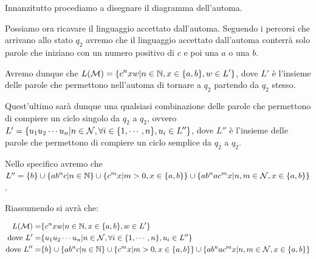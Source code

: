 Innanzitutto procediamo a disegnare il diagramma dell'automa.

\begin{figure}[ht]
    \centering
\end{figure}

Possiamo ora ricavare il linguaggio accettato dall'automa. Seguendo i percorsi che arrivano allo stato \(q_2\) avremo che il linguaggio accettato dall'automa conterrà solo parole che iniziano con un numero positivo di \(c\) e poi una \(a\) o una \(b\).

Avremo dunque che \(L(\mathcal{M})=\displaystyle{\left\{{c^{n}xw \vert n \in \mathbb{N}, x \in \displaystyle{\left\{{a,b}\right\}}, w \in L'}\right\}} \), dove \(L'\) è l'insieme delle parole che permettono nell'automa di tornare a \(q_2\) partendo da \(q_2\) stesso.

Quest'ultimo sarà dunque una qualsiasi combinazione delle parole che permettono di compiere un ciclo singolo da \(q_2\) a \(q_2\), ovvero \(L'=\displaystyle{\left\{{u_1u_2\cdots u_n\vert n \in \mathcal{N}, \forall i \in \displaystyle{\left\{{1, \cdots, n}\right\}}, u_i \in L''}\right\}}\), dove \(L''\) è l'insieme delle parole che permettono di compiere un ciclo semplice da \(q_2\) a \(q_2\).

Nello specifico avremo che \(L''=\displaystyle{\left\{{b}\right\}} \cup \displaystyle{\left\{{ab^{n}c \vert n \in \mathbb{N}}\right\}} \cup \displaystyle{\left\{{c^{m}x \vert m > 0, x \in \displaystyle{\left\{{a,b}\right\}}}\right\}} \cup \displaystyle{\left\{{ab^{n}ac^{m}x \vert n,m \in \mathcal{N}, x \in \displaystyle{\left\{{a,b}\right\}}}\right\}}\).

Riassumendo si avrà che:

\begin{equation}
    \begin{split}
        L(\mathcal{M}) = & \displaystyle{\left\{{c^{n}xw \vert n \in \mathbb{N}, x \in \displaystyle{\left\{{a,b}\right\}}, w \in L'}\right\}} \\
        \text {dove } L' = & \displaystyle{\left\{{u_1u_2\cdots u_n\vert n\in\mathcal{N}, \forall i \in \displaystyle{\left\{{1, \cdots, n}\right\}}, u_i \in L''}\right\}} \\
        \text {dove } L'' = & \displaystyle{\left\{{b}\right\}} \cup \displaystyle{\left\{{ab^{n}c \vert n \in \mathbb{N}}\right\}} \cup \displaystyle{\left\{{c^{m}x \vert m > 0, x \in \displaystyle{\left\{{a,b}\right\}}}\right\}} \cup \displaystyle{\left\{{ab^{n}ac^{m}x \vert n,m \in \mathcal{N}, x \in \displaystyle{\left\{{a,b}\right\}}}\right\}}
    \end{split}
\end{equation}

